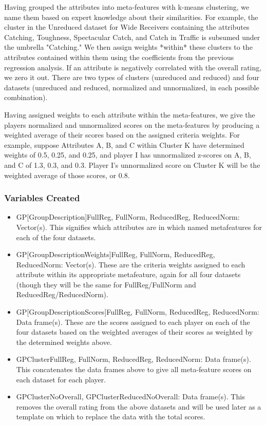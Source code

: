 \documentclass[11pt]{article}
\begin{document}
Having grouped the attributes into meta-features with k-means clustering, we name them based on expert knowledge about their similarities. For example, the cluster in the Unreduced dataset for Wide Receivers containing the attributes Catching, Toughness, Spectacular Catch, and Catch in Traffic is subsumed under the umbrella "Catching." We then assign weights *within* these clusters to the attributes contained within them using the coefficients from the previous regression analysis. If an attribute is negatively correlated with the overall rating, we zero it out. There are two types of clusters (unreduced and reduced) and four datasets (unreduced and reduced, normalized and unnormalized, in each possible combination).

Having assigned weights to each attribute within the meta-features, we give the players normalized and unnormalized scores on the meta-features by producing a weighted average of their scores based on the assigned criteria weights. For example, suppose Attributes A, B, and C within Cluster K have determined weights of 0.5, 0.25, and 0.25, and player I has unnormalized z-scores on A, B, and C of 1.3, 0.3, and 0.3. Player I's unnormalized score on Cluster K will be the weighted average of those scores, or 0.8.

\subsubsection{Variables Created}

\begin{itemize}
\item{GP[GroupDescription]FullReg, FullNorm, ReducedReg, ReducedNorm}: Vector(s). This signifies which attributes are in which named metafeatures for each of the four datasets.
\item{GP[GroupDescriptionWeights]FullReg, FullNorm, ReducedReg, ReducedNorm}: Vector(s). These are the criteria weights assigned to each attribute within its appropriate metafeature, again for all four datasets (though they will be the same for FullReg/FullNorm and ReducedReg/ReducedNorm).
\item{GP[GroupDescriptionScores]FullReg, FullNorm, ReducedReg, ReducedNorm}: Data frame(s). These are the scores assigned to each player on each of the four datasets based on the weighted averages of their scores as weighted by the determined weights above.
\item{GPClusterFullReg, FullNorm, ReducedReg, ReducedNorm}: Data frame(s). This concatenates the data frames above to give all meta-feature scores on each dataset for each player.
\item{GPClusterNoOverall, GPClusterReducedNoOverall}: Data frame(s). This removes the overall rating from the above datasets and will be used later as a template on which to replace the data with the total scores.
\end{itemize}
\end{document}
